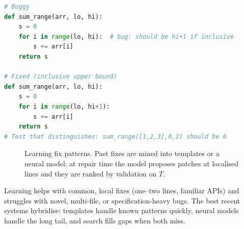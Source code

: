 \begin{lstlisting}[language=Python, caption={Python: off-by-one fix as a one-token change. A model that has seen many such pairs learns the pattern.}, label={lst:off-by-one}]
# Buggy
def sum_range(arr, lo, hi):
    s = 0
    for i in range(lo, hi):  # bug: should be hi+1 if inclusive
        s += arr[i]
    return s

# Fixed (inclusive upper bound)
def sum_range(arr, lo, hi):
    s = 0
    for i in range(lo, hi+1):
        s += arr[i]
    return s
# Test that distinguishes: sum_range([1,2,3],0,2) should be 6
\end{lstlisting}

\begin{figure}[h]\centering
{}
\caption{Learning fix patterns. Past fixes are mined into templates or a neural model; at repair time the model proposes patches at localised lines and they are ranked by validation on $T$.}
\label{fig:learned-repair}
\end{figure}

Learning helps with common, local fixes (one--two lines, familiar APIs) and struggles with novel, multi-file, or specification-heavy bugs. The best recent systems hybridise: templates handle known patterns quickly, neural models handle the long tail, and search fills gaps when both miss.

